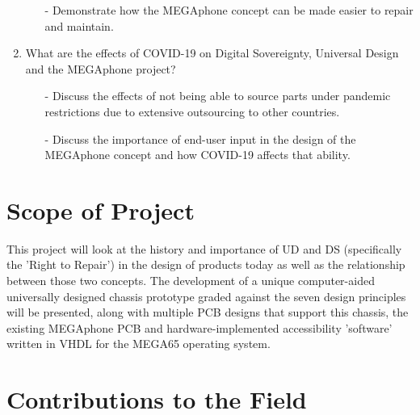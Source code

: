 \begin{enumerate}
\begin{enumerate}
        \item[-] Demonstrate how the MEGAphone concept can be made easier to repair and maintain.
        \end{enumerate} 
    \item What are the effects of COVID-19 on Digital Sovereignty, Universal Design and the MEGAphone project? %
        \begin{enumerate}
        \item[-] Discuss the effects of not being able to source parts under pandemic restrictions due to extensive outsourcing to other countries.
        \item[-] Discuss the importance of end-user input in the design of the MEGAphone concept and how COVID-19 affects that ability.
        \end{enumerate} 
\end{enumerate}

\section{Scope of Project}

This project will look at the history and importance of UD and DS (specifically the 'Right to Repair') in the design of products today as well as the relationship between those two concepts.
The development of a unique computer-aided universally designed chassis prototype graded against the seven design principles \cite{sevenprinciples} will be presented, along with multiple PCB designs that support this chassis, the existing MEGAphone PCB and hardware-implemented accessibility 'software' written in VHDL for the MEGA65 operating system.

\section{Contributions to the Field} %

